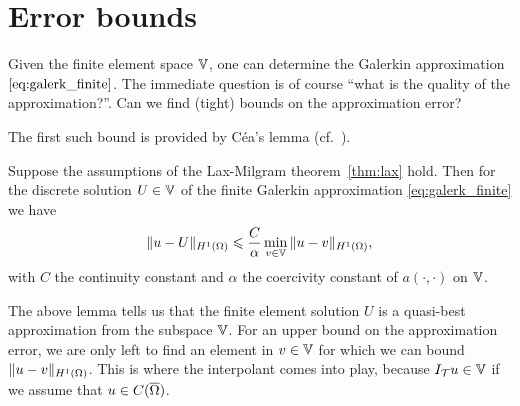 \documentclass[thesis.tex]{subfiles}
\begin{document}
  \section{Error bounds}
  Given the finite element space $\mathbb{V}$, one can determine the Galerkin approximation $\eqref{eq:galerk_finite}$. The immediate
  question is of course ``what is the quality of the approximation?''. Can we find (tight) bounds
  on the approximation error?

  The first such bound is provided by C\'ea's lemma (cf.~\cite[Thm~2.8.1]{brenner}).
  \begin{lem}
    Suppose the assumptions of the Lax-Milgram theorem~\ref{thm:lax} hold. Then for the discrete solution $U \in \mathbb{V}$ of the
    finite Galerkin approximation \eqref{eq:galerk_finite} we have
    \[
      \| u - U\|_{H^1(\Omega)} \leqslant {C \over \alpha} \min_{v \in \mathbb{V}} \| u - v\|_{H^1(\Omega)},
    \]
    with $C$ the continuity constant and $\alpha$ the coercivity constant of $a(\cdot, \cdot)$ on $\mathbb{V}$.
  \end{lem}
  The above lemma tells us that the finite element solution $U$ is a quasi-best approximation from the subspace $\mathbb{V}$.
  For an upper bound on the approximation error, we are
  only left to find an element in $v \in \mathbb{V}$ for which we can bound $\|u - v\|_{H^1(\Omega)}$. 
  This is where the interpolant comes into play, because $I_{\mathcal{T}}u \in \mathbb{V}$ if we assume that $u \in C(\overline{\Omega})$.
\end{document}
